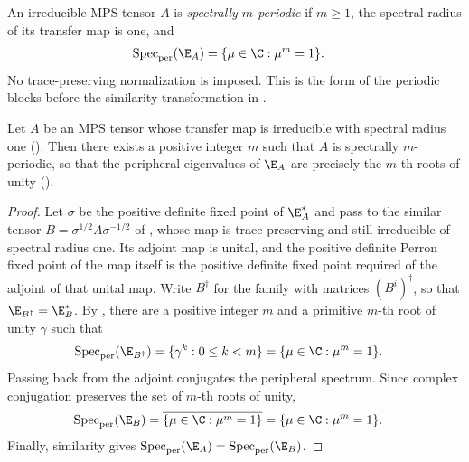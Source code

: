 \begin{definition}
    \label{def:spectral_periodic_tensor}
    \leanok
    An irreducible MPS tensor $A$ is \emph{spectrally $m$-periodic} if
    $m\geq1$, the spectral radius of its transfer map is one, and
    \begin{align}
        \operatorname{Spec}_{\mathrm{per}}(\E_A)
         & =\{\mu\in\C:\mu^m=1\}.
        \notag
    \end{align}
    No trace-preserving normalization is imposed.  This is the form of the
    periodic blocks before the similarity transformation in
    \cite[lines~248--261 and 313--332]{DeLasCuevas2017Irreducible}.
\end{definition}

\begin{lemma}
    \label{thm:spectral_periodic_period_existence}
    \leanok
    Let $A$ be an MPS tensor whose transfer map is irreducible with spectral
    radius one (\cite[lines~248--261]{DeLasCuevas2017Irreducible}). Then
    there exists a positive integer $m$ such that $A$ is spectrally $m$-periodic,
    so that the peripheral eigenvalues of $\E_A$ are precisely the
    $m$-th roots of unity (\cite[lines~257--258]{DeLasCuevas2017Irreducible}).
\end{lemma}
\begin{proof}
    \leanok
    Let $\sigma$ be the positive definite fixed point of $\E_A^*$ and pass to
    the similar tensor $B=\sigma^{1/2}A\sigma^{-1/2}$ of
    \cite[eq.~\emph{unital}, line~316]{DeLasCuevas2017Irreducible}, whose map is
    trace preserving and still irreducible of spectral radius one. Its adjoint
    map is unital, and the positive definite Perron fixed point of the map
    itself is the positive definite fixed point required of the adjoint of that
    unital map. Write $B^\dagger$ for the family with matrices $(B^i)^\dagger$,
    so that $\E_{B^\dagger}=\E_B^*$. By
    \cite[Theorem~6.6]{Wolf2012Quantum}, there are a positive integer $m$ and a
    primitive $m$-th root of unity $\gamma$ such that
    \begin{align}
        \operatorname{Spec}_{\mathrm{per}}(\E_{B^\dagger})
         & =\{\gamma^k:0\leq k<m\}
        =\{\mu\in\C:\mu^m=1\}.
        \notag
    \end{align}
    Passing back from the adjoint conjugates the peripheral spectrum. Since
    complex conjugation preserves the set of $m$-th roots of unity,
    \begin{align}
        \operatorname{Spec}_{\mathrm{per}}(\E_B)
         & =\overline{\{\mu\in\C:\mu^m=1\}}
        =\{\mu\in\C:\mu^m=1\}.
        \notag
    \end{align}
    Finally, similarity gives
    $\operatorname{Spec}_{\mathrm{per}}(\E_A)=\operatorname{Spec}_{\mathrm{per}}(\E_B)$.
\end{proof}

